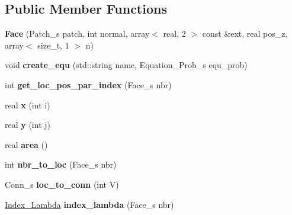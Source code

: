 \subsection*{Public Member Functions}
\begin{DoxyCompactItemize}
\item 
\hypertarget{classFace_a66d5955aa6386be0fd482a5ac1174229}{
{\bfseries Face} (Patch\_\-s patch, int normal, array$<$ real, 2 $>$ const \&ext, real pos\_\-z, array$<$ size\_\-t, 1 $>$ n)}
\label{classFace_a66d5955aa6386be0fd482a5ac1174229}

\item 
\hypertarget{classFace_a23e698d2341c3634212729c78bba154f}{
void {\bfseries create\_\-equ} (std::string name, Equation\_\-Prob\_\-s equ\_\-prob)}
\label{classFace_a23e698d2341c3634212729c78bba154f}

\item 
\hypertarget{classFace_a7ebc4163752a05d82e184a3a4c8671b3}{
int {\bfseries get\_\-loc\_\-pos\_\-par\_\-index} (Face\_\-s nbr)}
\label{classFace_a7ebc4163752a05d82e184a3a4c8671b3}

\item 
\hypertarget{classFace_aed5980668f26bc29338dfa11b32919f5}{
real {\bfseries x} (int i)}
\label{classFace_aed5980668f26bc29338dfa11b32919f5}

\item 
\hypertarget{classFace_a9a4d892bf5e8782c898e15aa5a989806}{
real {\bfseries y} (int j)}
\label{classFace_a9a4d892bf5e8782c898e15aa5a989806}

\item 
\hypertarget{classFace_a2d20ebd0d99063967bb26657abebbcbe}{
real {\bfseries area} ()}
\label{classFace_a2d20ebd0d99063967bb26657abebbcbe}

\item 
\hypertarget{classFace_a06eb55371bc742e523a9eb94a573209d}{
int {\bfseries nbr\_\-to\_\-loc} (Face\_\-s nbr)}
\label{classFace_a06eb55371bc742e523a9eb94a573209d}

\item 
\hypertarget{classFace_a60baec409a104a88e6622efa2f80122c}{
Conn\_\-s {\bfseries loc\_\-to\_\-conn} (int V)}
\label{classFace_a60baec409a104a88e6622efa2f80122c}

\item 
\hypertarget{classFace_a9a5eb93863dc767848261afa813ca039}{
\hyperlink{structIndex__Lambda}{Index\_\-Lambda} {\bfseries index\_\-lambda} (Face\_\-s nbr)}
\label{classFace_a9a5eb93863dc767848261afa813ca039}


\end{DoxyCompactItemize}
